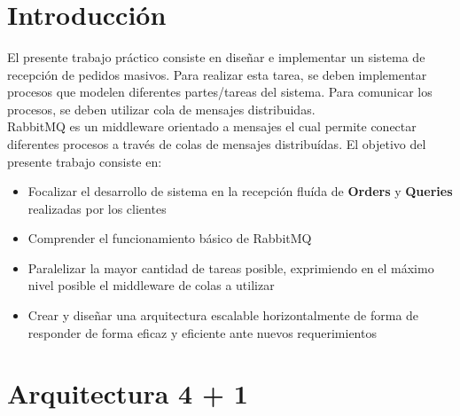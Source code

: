\documentclass[a4paper,10pt]{article}
\title{  }
\begin{document}
	\maketitle %
	\newpage

	\tableofcontents 
	\newpage

	\section{Introducción}
		El presente trabajo práctico consiste en diseñar e 
        implementar un sistema de recepción de pedidos masivos. Para 
        realizar esta tarea, se deben implementar procesos que
        modelen diferentes partes/tareas del sistema. Para comunicar los 
        procesos, se deben utilizar cola de mensajes distribuidas. \\
        \indent RabbitMQ es un middleware orientado a mensajes el cual 
        permite conectar diferentes procesos a través de colas de mensajes
        distribuídas. El objetivo del presente trabajo consiste en:
        
        \begin{itemize}
            \item Focalizar el desarrollo de sistema en la recepción fluída
            de \textbf{Orders} y \textbf{Queries} realizadas por los clientes
            \item Comprender el funcionamiento básico de RabbitMQ 
            \item Paralelizar la mayor cantidad de tareas posible, exprimiendo
            en el máximo nivel posible el middleware de colas a utilizar
            \item Crear y diseñar una arquitectura escalable horizontalmente
            de forma de responder de forma eficaz y eficiente ante nuevos
            requerimientos
        \end{itemize}

    \newpage
    \section{Arquitectura 4 + 1}
\end{document}
